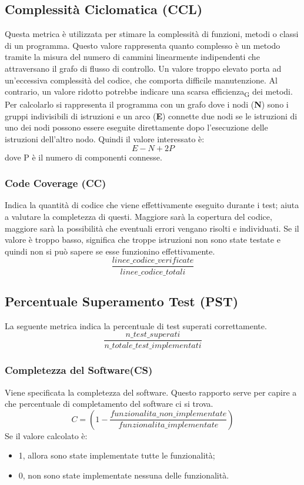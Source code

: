 \subsection{Complessità Ciclomatica (CCL)}
Questa metrica è utilizzata per stimare la complessità di funzioni, metodi o classi di un programma. Questo valore rappresenta quanto complesso è un metodo tramite la misura del numero di cammini linearmente indipendenti che attraversano il grafo di flusso di controllo. Un valore troppo elevato porta ad un’eccessiva complessità del codice, che comporta difficile manutenzione. Al contrario, un valore ridotto potrebbe indicare una scarsa efficienza\textsubscript{G} dei metodi. Per calcolarlo si rappresenta il programma con un grafo dove i  nodi (\textbf{N}) sono i gruppi indivisibili di istruzioni e un arco (\textbf{E}) connette due nodi se le istruzioni di uno dei nodi possono essere eseguite direttamente dopo l’esecuzione delle istruzioni dell’altro nodo. Quindi il valore interessato è:
\[E-N+2P\] 
dove P è il numero di componenti connesse.
\subsubsection{Code Coverage (CC)}
Indica la quantità di codice che viene effettivamente eseguito durante i test; aiuta a valutare la completezza di questi. Maggiore sarà la copertura del codice, maggiore sarà la possibilità che eventuali errori vengano risolti e individuati. Se il valore è troppo basso, significa che troppe istruzioni non sono state testate e quindi non si può sapere se esse funzionino effettivamente.
\[\frac{linee\_codice\_verificate}{linee\_codice\_totali}\]

\subsection{Percentuale Superamento Test (PST)}
La seguente metrica indica la percentuale di test superati correttamente.
\[\frac{n\_test\_superati}{n\_totale\_test\_implementati}\]

\subsubsection{Completezza del Software(CS)}
Viene specificata la completezza del software. Questo rapporto serve per capire a che percentuale di completamento del software ci si trova. 
\[C = (1- \frac{funzionalita\_non\_implementate }{funzionalita\_implementate})\]
Se il valore calcolato è:
\begin{itemize}
    \item 1, allora sono state implementate tutte le funzionalità;
    \item 0, non sono state implementate nessuna delle funzionalità.
\end{itemize}

